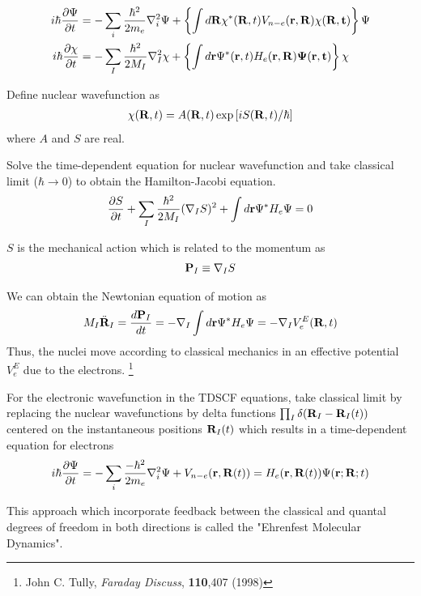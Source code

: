 \documentclass[slidestop,mathserif,compress,xcolor=svgnames]{beamer}
\begin{document}
\begin{frame}[allowframebreaks]
\begin{itemize}
{\begin{align*}
i\hbar\dfrac{\partial\Psi}{\partial t} &= -\sum_i\dfrac{\hbar^2}{2m_e}\nabla^2_i\Psi + \left\{\int d{\bf R}\chi^\ast({\bf R},t)V_{n-e}(\bf r,R)\chi({\bf R},t)\right\}\Psi\\
i\hbar\dfrac{\partial\chi}{\partial t} &= -\sum_I\dfrac{\hbar^2}{2M_I}\nabla^2_I\chi + \left\{\int d{\bf r}\Psi^\ast({\bf r},t)H_{e}(\bf r,R)\Psi({\bf r},t)\right\}\chi
\end{align*}
\item Define nuclear wavefunction as
\begin{align*}
\chi({\bf R},t) = A({\bf R},t)\exp\left[iS({\bf R},t)/\hbar\right]
\end{align*}
where $A$ and $S$ are real.
\item Solve the time-dependent equation for nuclear wavefunction and take classical limit ($\hbar\rightarrow0$) to obtain the Hamilton-Jacobi equation.
\begin{align*}
\dfrac{\partial S}{\partial t} + \sum_I\dfrac{\hbar^2}{2M_I}(\nabla_IS)^2 + \int d{\bf r}\Psi^\ast H_e\Psi = 0
\end{align*}
\item $S$ is the mechanical action which is related to the momentum as
\begin{align*}
{\bf P}_I \equiv \nabla_IS
\end{align*}
\item We can obtain the Newtonian equation of motion as
\begin{align*}
M_I\ddot{\bf R}_I = \dfrac{d{\bf P}_I}{dt} = -\nabla_I\int d{\bf r}\Psi^\ast H_e\Psi = -\nabla_IV^{E}_{e}({\bf R},t)
\end{align*}
Thus, the nuclei move according to classical mechanics in an effective potential $V^E_e$ due to the electrons.
\footnote{\tiny John C. Tully, \textit{Faraday Discuss}, \textbf{110},407 (1998)}
\item For the electronic wavefunction in the TDSCF equations, take classical limit by replacing the nuclear wavefunctions by delta functions $\prod_I\delta({\bf R}_I - {\bf R}_I(t))$ centered on the instantaneous positions ${\bf R}_I(t)$ which results in a time-dependent equation for electrons
\begin{align*}
i\hbar\dfrac{\partial\Psi}{\partial t} = -\sum_i\dfrac{-\hbar^2}{2m_e}\nabla^2_i\Psi + V_{n-e}({\bf r},{\bf R}(t)) = H_e({\bf r},{\bf R}(t))\Psi({\bf r};{\bf R};t)
\end{align*}
\item This approach which incorporate feedback between the classical and quantal degrees of freedom in both directions is called the "Ehrenfest Molecular Dynamics".
}
\end{itemize}
\end{frame}
\end{document}
